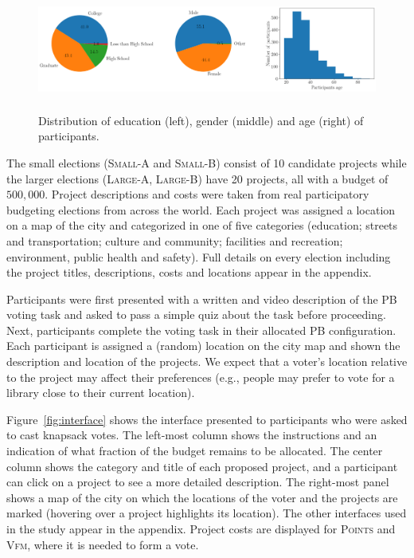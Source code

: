 \documentclass[mnsc,blindrev]{informs3_freeuse} %
\newcommand{\kibitz}[2]{\ifnum\Comments=1{\color{#1}{#2}}\fi}
\newcommand{\rf}[1]{\kibitz{blue}{[Roy says:#1]}}
\newcommand{\gb}[1]{\kibitz{red}{[GB:#1]}}
\newcommand{\points}{\textsc{Points}}
\newcommand{\vfm}{\textsc{Vfm}}
\begin{document}
\begin{figure}[!h]
\begin{center}
\includegraphics[width=15cm,height=4cm]{experiment/dists.png}
\caption{Distribution of education (left), gender (middle) and age (right) of participants. 
}\label{fig:distribution}
\end{center}
\end{figure}

The small elections (\textsc{Small-A} and  \textsc{Small-B}) consist of 10 candidate projects while the larger elections  (\textsc{Large-A},  \textsc{Large-B}) have 20 projects, all with a budget of $500,000$.
Project descriptions and costs were taken from real participatory budgeting elections from across the world.  
Each project was assigned a location on a map of the  city  and categorized in one of five  categories   (education; streets and transportation; culture and community; facilities and recreation; environment, public health and safety).  
Full  details  on every election including the project titles, descriptions,  costs and locations appear in the appendix.\rf{appendix}


 
Participants were first presented with a written and video description of the PB voting task and asked to pass  a simple quiz about the task before proceeding. 
Next, participants complete  the voting task  in their allocated PB configuration.
Each participant is assigned a  (random) location on the city map and   shown the description and location of the projects. 
We expect that a voter's location relative to  the project may affect their   preferences (e.g., people may prefer to vote for a library  close to their current location). 
  

 Figure~\ref{fig:interface} shows the interface  presented to participants who were asked to cast knapsack votes. 
 The left-most column shows the instructions and an indication of what fraction of the budget remains to be allocated. The center column shows the category and title of each proposed project, and a participant can click on a project to see a more detailed description. The right-most panel shows a map of the city on which the locations of the voter and the projects are marked (hovering over a project highlights its location). The other interfaces used in the study appear in the appendix. \gb{Note:appendix} 
 Project costs are  displayed for \points{} and \vfm{}, where it is needed to form a vote. 
\end{document}
